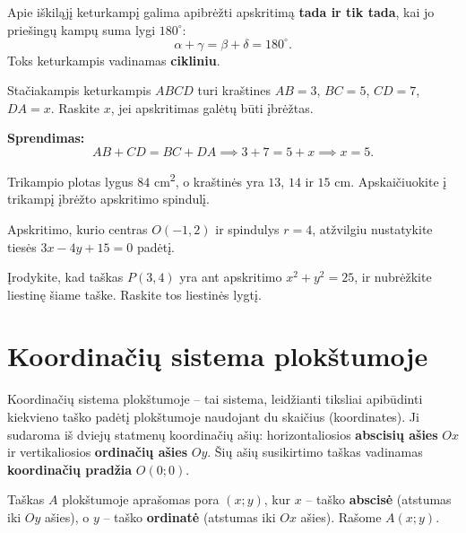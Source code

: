 \begin{theorem}
Apie iškiląjį keturkampį galima apibrėžti apskritimą \textbf{tada ir tik tada}, kai jo priešingų kampų suma lygi $180^\circ$:
\[
\alpha + \gamma = \beta + \delta = 180^\circ.
\]
Toks keturkampis vadinamas \textbf{cikliniu}.
\end{theorem}

\begin{example}
Stačiakampis keturkampis $ABCD$ turi kraštines $AB = 3$, $BC = 5$, $CD = 7$, $DA = x$. Raskite $x$, jei apskritimas galėtų būti įbrėžtas.

\textbf{Sprendimas:}
\[
AB + CD = BC + DA \implies 3 + 7 = 5 + x \implies x = 5.
\]
\end{example}

\begin{exercise}
Trikampio plotas lygus $84$ cm\textsuperscript{2}, o kraštinės yra $13$, $14$ ir $15$ cm. Apskaičiuokite į trikampį įbrėžto apskritimo spindulį.
\end{exercise}

\begin{exercise}
Apskritimo, kurio centras $O(-1, 2)$ ir spindulys $r = 4$, atžvilgiu nustatykite tiesės $3x - 4y + 15 = 0$ padėtį.
\end{exercise}

\begin{exercise}
Įrodykite, kad taškas $P(3, 4)$ yra ant apskritimo $x^2 + y^2 = 25$, ir nubrėžkite liestinę šiame taške. Raskite tos liestinės lygtį.
\end{exercise}

\section{Koordinačių sistema plokštumoje}

Koordinačių sistema plokštumoje – tai sistema, leidžianti tiksliai apibūdinti kiekvieno taško padėtį plokštumoje naudojant du skaičius (koordinates). Ji sudaroma iš dviejų statmenų koordinačių ašių: horizontaliosios \textbf{abscisių ašies} $Ox$ ir vertikaliosios \textbf{ordinačių ašies} $Oy$. Šių ašių susikirtimo taškas vadinamas \textbf{koordinačių pradžia} $O(0;0)$.

\begin{definition}
Taškas $A$ plokštumoje aprašomas pora $(x; y)$, kur $x$ – taško \textbf{abscisė} (atstumas iki $Oy$ ašies), o $y$ – taško \textbf{ordinatė} (atstumas iki $Ox$ ašies). Rašome $A(x; y)$.
\end{definition}


